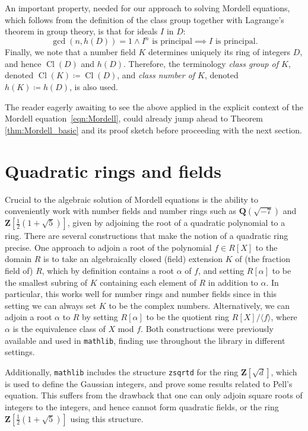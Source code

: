 \documentclass[sigplan,10pt,nonacm,
screen]{acmart} \settopmatter{printfolios=true,printccs=false,printacmref=false}
\newcommand{\mathlib}{\lstinline{mathlib}\xspace}
\newcommand{\QQ}{\mathbf{Q}}
\newcommand{\ZZ}{\mathbf{Z}}
\DeclareMathOperator{\Cl}{Cl}
\begin{document}
An important property, needed for our approach to solving Mordell equations, which follows from the definition of the class group together with Lagrange's theorem in group theory, is that for ideals $I$ in $D$:
\begin{equation}\label{eqn:principality_from_power}
 \gcd(n,h(D))=1 \wedge I^n \text{ is principal} \implies I \text{ is principal}.
\end{equation}
Finally, we note that a number field $K$ determines uniquely its ring of integers $D$, and hence $\Cl(D)$ and $h(D)$. Therefore, the terminology \emph{class group of $K$}, denoted $\Cl(K)\coloneqq\Cl(D)$, and \emph{class number of $K$}, denoted $h(K)\coloneqq h(D)$, is also used.

The reader eagerly awaiting to see the above applied in the explicit context of the Mordell equation~\eqref{eqn:Mordell}, could already jump ahead to Theorem \ref{thm:Mordell_basic} and its proof sketch before proceeding with the next section.

\section{Quadratic rings and fields}\label{sec:QuadraticRings}

Crucial to the algebraic solution of Mordell equations is the ability to conveniently work with number fields and number rings such as $\QQ(\sqrt{-7})$ and $\ZZ\left[\frac{1}{2}(1 + \sqrt{5})\right]$,
    given by adjoining the root of a quadratic polynomial to a ring.
    There are several constructions that make the notion of a quadratic ring precise.
    One approach to adjoin a root of the polynomial $f \in R[X]$ to the domain $R$ is to take an algebraically closed (field) extension $K$ of (the fraction field of) $R$, which by definition contains a root $\alpha$ of $f$, and setting $R[\alpha]$ to be the smallest subring of $K$ containing each element of $R$ in addition to $\alpha$.
    In particular, this works well for number rings and number fields since in this setting we can always set $K$ to be the complex numbers.
    Alternatively, we can adjoin a root $\alpha$ to $R$ by setting $R[\alpha]$ to be the quotient ring $R[X] / \langle f\rangle$, where $\alpha$ is the equivalence class of $X$ mod $f$.
    Both constructions were previously available and used in \mathlib,
    finding use throughout the library in different settings.

    Additionally, \mathlib includes the structure \lstinline{zsqrtd} for the ring $\ZZ[\sqrt d]$, which is used to define the Gaussian integers, and prove some results related to Pell's equation.
    This suffers from the drawback that one can only adjoin square roots of integers to the integers, and hence cannot form quadratic fields, or the ring $\ZZ\left[\frac{1}{2}(1 + \sqrt{5})\right]$ using this structure.
\end{document}

